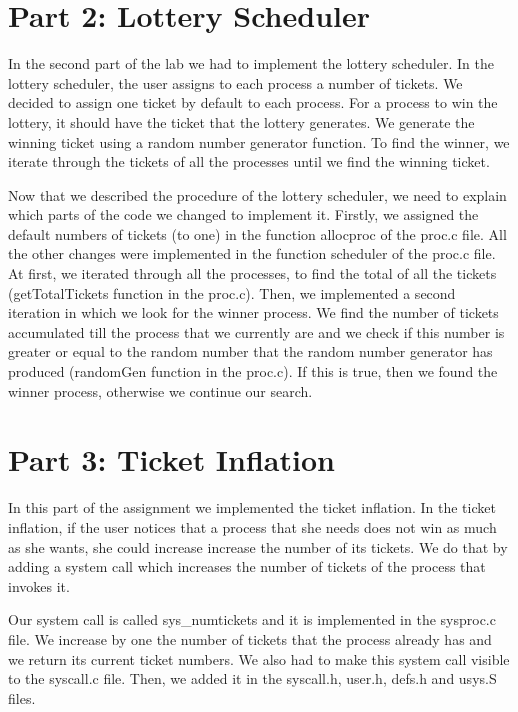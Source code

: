 \documentclass[a4paper,12pt]{article}
\begin{document}
\section*{Part 2: Lottery Scheduler}
In the second part of the lab we had to implement the lottery scheduler. In the lottery scheduler, the user assigns to each process a number of tickets. We decided to assign one ticket by default to each process. For a process to win the lottery, it should have the ticket that the lottery generates. We generate the winning ticket using a random number generator function. To find the winner, we iterate through the tickets of all the processes until we find the winning ticket. 
\par Now that we described the procedure of the lottery scheduler, we need to explain which parts of the code we changed to implement it. Firstly, we assigned the default numbers of tickets (to one) in the function allocproc of the proc.c file. All the other changes were implemented in the function scheduler of the proc.c file. At first, we iterated through all the processes, to find the  total of all the tickets (getTotalTickets function in the proc.c). Then, we implemented a second iteration in which we look for the winner process. We find the number of tickets accumulated till the process that we currently are and we check if this number is greater or equal to the random number that the random number generator has produced (randomGen function in the proc.c). If this is true, then we found the winner process, otherwise we continue our search. 

\section*{Part 3: Ticket Inflation}
In this part of the assignment we implemented the ticket inflation. In the ticket inflation, if the user notices that a process that she needs does not win as much as she wants, she could increase increase the number of its tickets. We do that by adding a system call which increases the number of tickets of the process that invokes it. 

\par Our system call is called sys\_numtickets and it is implemented in the sysproc.c file. We increase by one the number of tickets that the process already has and we return its current ticket numbers. We also had to make this system call visible to the syscall.c file. Then, we added it in the syscall.h, user.h, defs.h and usys.S files. 
\end{document}
